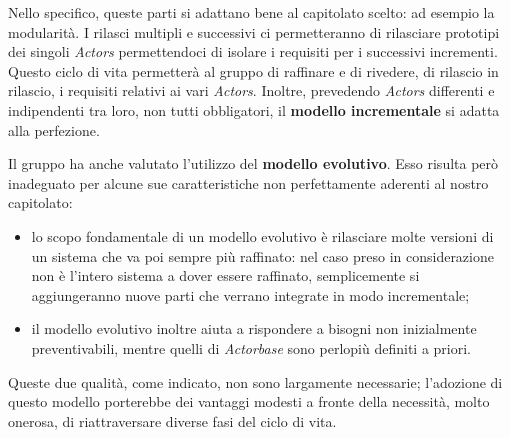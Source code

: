 \documentclass[a4paper]{report}
\begin{document}
			Nello specifico, queste parti si adattano bene al capitolato scelto: ad esempio la modularità. I rilasci 
			multipli e successivi ci permetteranno di rilasciare prototipi dei singoli \emph{Actors} permettendoci di
			isolare i requisiti per i successivi incrementi. Questo ciclo di vita permetterà al gruppo di raffinare e 
			di rivedere, di rilascio in rilascio, i requisiti relativi ai vari \emph{Actors}. Inoltre, prevedendo 
			\emph{Actors} differenti e indipendenti tra loro, non tutti obbligatori, il \textbf{modello incrementale} 
			si adatta alla perfezione.
			
			Il gruppo ha anche valutato l'utilizzo del \textbf{modello evolutivo}. Esso risulta però inadeguato per alcune sue 
			caratteristiche non perfettamente aderenti al nostro capitolato:
			\begin{itemize}
				\item lo scopo fondamentale di un modello evolutivo è rilasciare molte versioni di un sistema che va 
				poi sempre più raffinato: nel caso preso in considerazione non è l'intero sistema a dover essere raffinato, 
				semplicemente si aggiungeranno nuove parti che verrano integrate in modo incrementale;
				\item il modello evolutivo inoltre aiuta a rispondere a bisogni non inizialmente preventivabili, mentre 
				quelli di \emph{Actorbase} sono perlopiù definiti a priori.
			\end{itemize}
			Queste due qualità, come indicato, non sono largamente necessarie; l'adozione di questo modello porterebbe dei 
			vantaggi modesti a fronte della necessità, molto onerosa, di riattraversare diverse fasi del ciclo di vita.
\end{document}
